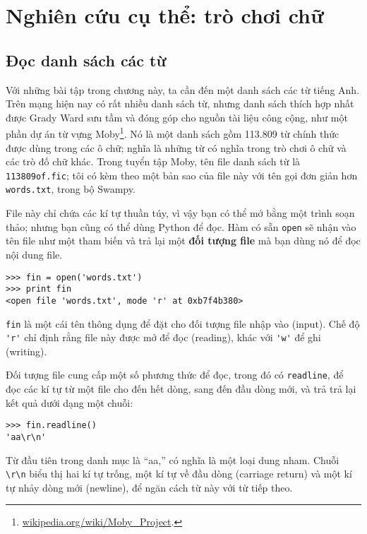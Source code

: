 \documentclass[11pt]{book}
\begin{document}
\chapter{Nghiên cứu cụ thể: trò chơi chữ}

\section{Đọc danh sách các từ}
\label{wordlist}

Với những bài tập trong chương này, ta cần đến một danh sách
các từ tiếng Anh. Trên mạng hiện nay có rất nhiều danh sách từ,
nhưng  danh sách thích hợp nhất được Grady Ward sưu tầm và 
đóng góp cho nguồn tài liệu công cộng, như một phần dự án
từ vựng Moby\footnote{\url{wikipedia.org/wiki/Moby_Project}.}. 
Nó là một danh sách gồm 113.809 từ chính thức được dùng trong
các ô chữ; nghĩa là những từ có nghĩa trong trò chơi ô chữ và các
trò đố chữ khác. Trong tuyển tập Moby, tên file danh sách từ là
 {\tt 113809of.fic}; tôi có kèm theo một bản sao của file này
với tên gọi đơn giản hơn {\tt words.txt}, trong bộ
Swampy.


File này chỉ chứa các kí tự thuần túy, vì vậy bạn có thể mở
bằng một trình soạn thảo; nhưng bạn cũng có thể dùng Python
để đọc. Hàm có sẵn {\tt open} sẽ nhận vào tên file như một
tham biến và trả lại một {\bf đối tượng file} mà bạn dùng nó
để đọc nội dung file.


\beforeverb
\begin{verbatim}
>>> fin = open('words.txt')
>>> print fin
<open file 'words.txt', mode 'r' at 0xb7f4b380>
\end{verbatim}
\afterverb
%
{\tt fin} là một cái tên thông dụng để đặt cho đối tượng file
nhập vào (input). Chế độ \verb"'r'" chỉ định rằng file này được
mở để đọc (reading), khác với \verb"'w'" để ghi (writing).


Đối tượng file cung cấp một số phương thức để đọc, trong đó có 
{\tt readline}, để đọc các kí tự từ một file cho đến hết dòng,
sang đến đầu dòng mới, và trả trả lại kết quả dưới dạng một chuỗi:

\beforeverb
\begin{verbatim}
>>> fin.readline()
'aa\r\n'
\end{verbatim}
\afterverb
%
Từ đầu tiên trong danh mục là ``aa,'' có nghĩa là một loại
dung nham. Chuỗi \verb"\r\n" biểu thị hai kí tự trống, một kí tự 
về đầu dòng (carriage return) và một kí tự nhảy dòng mới (newline), 
để ngăn cách từ này với từ tiếp theo.
\end{document}
